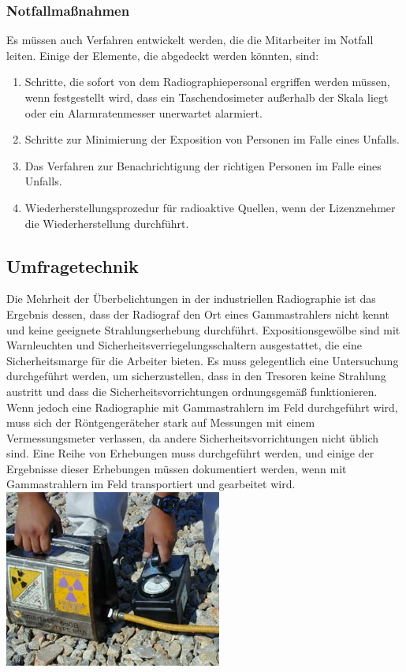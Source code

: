 {\subsubsection{Notfallmaßnahmen}
Es müssen auch Verfahren entwickelt werden, die die Mitarbeiter im Notfall leiten. Einige der Elemente, die abgedeckt werden könnten, sind:\\
\begin{enumerate}
\item Schritte, die sofort von dem Radiographiepersonal ergriffen werden müssen, wenn festgestellt wird, dass ein Taschendosimeter außerhalb der Skala liegt oder ein Alarmratenmesser unerwartet alarmiert.
\item Schritte zur Minimierung der Exposition von Personen im Falle eines Unfalls.
\item Das Verfahren zur Benachrichtigung der richtigen Personen im Falle eines Unfalls.
\item Wiederherstellungsprozedur für radioaktive Quellen, wenn der Lizenznehmer die Wiederherstellung durchführt.

\end{enumerate}
\subsection{Umfragetechnik}
Die Mehrheit der Überbelichtungen in der industriellen Radiographie ist das Ergebnis dessen, dass der Radiograf den Ort eines Gammastrahlers nicht kennt und keine geeignete Strahlungserhebung durchführt.
Expositionsgewölbe sind mit Warnleuchten und Sicherheitsverriegelungsschaltern ausgestattet, die eine Sicherheitsmarge für die Arbeiter bieten. Es muss gelegentlich eine Untersuchung durchgeführt werden, um sicherzustellen, dass in den Tresoren keine Strahlung austritt und dass die Sicherheitsvorrichtungen ordnungsgemäß funktionieren. Wenn jedoch eine Radiographie mit Gammastrahlern im Feld durchgeführt wird, muss sich der Röntgengeräteher stark auf Messungen mit einem Vermessungsmeter verlassen, da andere Sicherheitsvorrichtungen nicht üblich sind. Eine Reihe von Erhebungen muss durchgeführt werden, und einige der Ergebnisse dieser Erhebungen müssen dokumentiert werden, wenn mit Gammastrahlern im Feld transportiert und gearbeitet wird.
\includegraphics[scale=0.9]{img/cameraTest.jpg}\\
}

